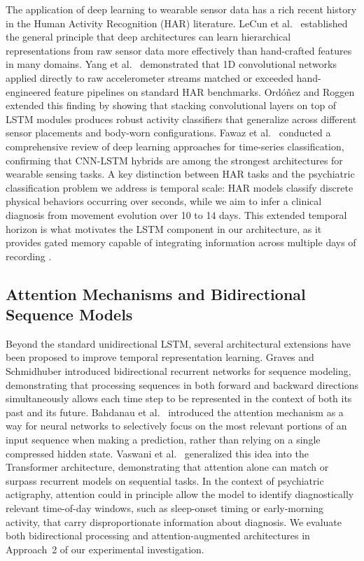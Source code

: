 The application of deep learning to wearable sensor data has a rich recent history in the Human Activity Recognition (HAR) literature. LeCun et al.\ \cite{lecun2015deep} established the general principle that deep architectures can learn hierarchical representations from raw sensor data more effectively than hand-crafted features in many domains. Yang et al.\ \cite{yang2015deep} demonstrated that 1D convolutional networks applied directly to raw accelerometer streams matched or exceeded hand-engineered feature pipelines on standard HAR benchmarks. Ord\'{o}{\~n}ez and Roggen \cite{ordonez2016deep} extended this finding by showing that stacking convolutional layers on top of LSTM modules produces robust activity classifiers that generalize across different sensor placements and body-worn configurations. Fawaz et al.\ \cite{fawaz2019deep} conducted a comprehensive review of deep learning approaches for time-series classification, confirming that CNN-LSTM hybrids are among the strongest architectures for wearable sensing tasks. A key distinction between HAR tasks and the psychiatric classification problem we address is temporal scale: HAR models classify discrete physical behaviors occurring over seconds, while we aim to infer a clinical diagnosis from movement evolution over 10 to 14 days. This extended temporal horizon is what motivates the LSTM component in our architecture, as it provides gated memory capable of integrating information across multiple days of recording \cite{hochreiter1997lstm}.

\subsection{Attention Mechanisms and Bidirectional Sequence Models}

Beyond the standard unidirectional LSTM, several architectural extensions have been proposed to improve temporal representation learning. Graves and Schmidhuber \cite{graves2005bilstm} introduced bidirectional recurrent networks for sequence modeling, demonstrating that processing sequences in both forward and backward directions simultaneously allows each time step to be represented in the context of both its past and its future. Bahdanau et al.\ \cite{bahdanau2015attention} introduced the attention mechanism as a way for neural networks to selectively focus on the most relevant portions of an input sequence when making a prediction, rather than relying on a single compressed hidden state. Vaswani et al.\ \cite{vaswani2017attention} generalized this idea into the Transformer architecture, demonstrating that attention alone can match or surpass recurrent models on sequential tasks. In the context of psychiatric actigraphy, attention could in principle allow the model to identify diagnostically relevant time-of-day windows, such as sleep-onset timing or early-morning activity, that carry disproportionate information about diagnosis. We evaluate both bidirectional processing and attention-augmented architectures in Approach~2 of our experimental investigation.

